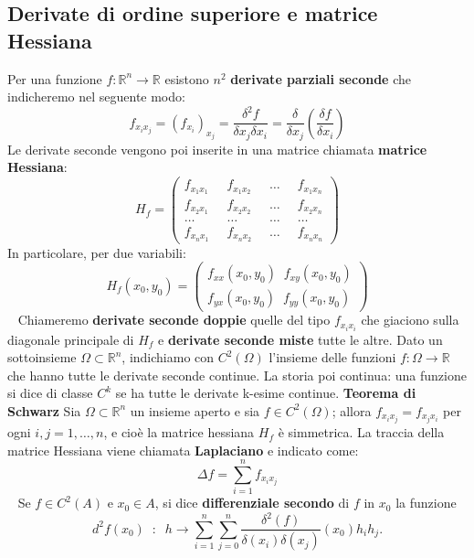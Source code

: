 \subsection{Derivate di ordine superiore e matrice Hessiana}
Per una funzione $f: \mathbb{R}^n \rightarrow  \mathbb{R}$ esistono $n^2$ \textbf{derivate parziali seconde} che indicheremo nel seguente modo:
\[
    f_{x_ix_j} = (f_{x_i})_{x_j} = \frac{\delta^2 f}{\delta x_{j} \delta x_{i}} = \frac{\delta }{\delta x_{j}}\left(\frac{\delta f}{\delta x_i}\right)
\]
Le derivate seconde vengono poi inserite in una matrice chiamata \textbf{matrice Hessiana}:
\[ H_f=\left(\begin{matrix}
        f_{x_1x_1} \;\; &f_{x_1x_2} \;\; &\dots \;\; &f_{x_1x_n}\\
        f_{x_2x_1} \;\; &f_{x_2x_2} \;\; &\dots \;\; &f_{x_2x_n}\\
        \dots \;\; &\dots \;\; &\dots \;\; &\dots\\
        f_{x_nx_1} \;\; &f_{x_nx_2} \;\; &\dots \;\; &f_{x_nx_n}
    \end{matrix}\right)
\]
In particolare, per due variabili:
\[
    H_f(x_0, y_0) = \left(\begin{matrix}
        f_{xx}(x_0, y_0) \;\; f_{xy}(x_0, y_0)\\
        f_{yx}(x_0, y_0) \;\; f_{yy}(x_0, y_0)
    \end{matrix}\right)
\]
\ \newline
Chiameremo \textbf{derivate seconde doppie} quelle del tipo $f_{x_ix_i}$ che giaciono sulla diagonale principale di $H_f$ e \textbf{derivate seconde miste} tutte le altre.\newline
\newline
Dato un sottoinsieme $\Omega \subset \mathbb{R}^n$, indichiamo con $C^2(\Omega)$ l'insieme delle funzioni $f:\Omega \rightarrow \mathbb{R}$ che hanno tutte le derivate seconde continue. La storia poi continua: una funzione si dice di classe $C^k$ se ha tutte le derivate k-esime continue.\newline
\newline
\textbf{Teorema di Schwarz} Sia $\Omega \subset \mathbb{R}^n$ un insieme aperto e sia $f \in C^2(\Omega)$; allora $f_{x_ix_j} = f_{x_jx_i}$ per ogni $i,j = 1,\dots,n$, e cioè la matrice hessiana $H_f$ è simmetrica.\newline
\newline
La traccia della matrice Hessiana viene chiamata \textbf{Laplaciano} e indicato come:
\[
    \Delta f = \sum_{i=1}^{n} f_{x_ix_j}
\]
\ \newline
Se $f \in C^2(A)$ e $x_0 \in A$, si dice \textbf{differenziale secondo} di $f$ in $x_0$ la funzione
\[
    d^2f(x_0) \;\;:\;\; h \rightarrow \sum_{i=1}^{n}\sum_{j=0}^{n}\frac{\delta^2(f)}{\delta(x_i) \delta(x_j)}(x_0)h_ih_j.
\]
